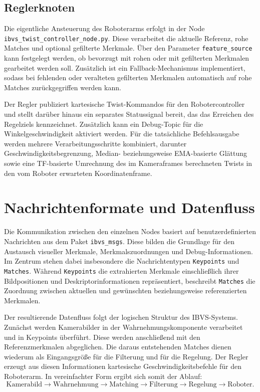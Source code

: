 \subsection{Reglerknoten}
\label{sec:implementierung_reglerknoten}

Die eigentliche Ansteuerung des Roboterarms erfolgt in der Node \texttt{ibvs\_twist\_controller\_node.py}. Diese verarbeitet die aktuelle Referenz, rohe Matches und optional gefilterte Merkmale. Über den Parameter \texttt{feature\_source} kann festgelegt werden, ob bevorzugt mit rohen oder mit gefilterten Merkmalen gearbeitet werden soll. Zusätzlich ist ein Fallback-Mechanismus implementiert, sodass bei fehlenden oder veralteten gefilterten Merkmalen automatisch auf rohe Matches zurückgegriffen werden kann. 

Der Regler publiziert kartesische Twist-Kommandos für den Robotercontroller und stellt darüber hinaus ein separates Statussignal bereit, das das Erreichen des Regelziels kennzeichnet. Zusätzlich kann ein Debug-Topic für die Winkelgeschwindigkeit aktiviert werden. Für die tatsächliche Befehlsausgabe werden mehrere Verarbeitungsschritte kombiniert, darunter Geschwindigkeitsbegrenzung, Median- beziehungsweise \ac{EMA}-basierte Glättung sowie eine \ac{TF}-basierte Umrechnung des im Kameraframes berechneten Twists in den vom Roboter erwarteten Koordinatenframe. 

\section{Nachrichtenformate und Datenfluss}
\label{sec:nachrichtenformate_datenfluss}

Die Kommunikation zwischen den einzelnen Nodes basiert auf benutzerdefinierten Nachrichten aus dem Paket \texttt{ibvs\_msgs}. Diese bilden die Grundlage für den Austausch visueller Merkmale, Merkmalszuordnungen und Debug-Informationen. Im Zentrum stehen dabei insbesondere die Nachrichtentypen \texttt{Keypoints} und \texttt{Matches}. Während \texttt{Keypoints} die extrahierten Merkmale einschließlich ihrer Bildpositionen und Deskriptorinformationen repräsentiert, beschreibt \texttt{Matches} die Zuordnung zwischen aktuellen und gewünschten beziehungsweise referenzierten Merkmalen.

Der resultierende Datenfluss folgt der logischen Struktur des \ac{IBVS}-Systems. Zunächst werden Kamerabilder in der Wahrnehmungskomponente verarbeitet und in Keypoints überführt. Diese werden anschließend mit den Referenzmerkmalen abgeglichen. Die daraus entstehenden Matches dienen wiederum als Eingangsgröße für die Filterung und für die Regelung. Der Regler erzeugt aus diesen Informationen kartesische Geschwindigkeitsbefehle für den Roboterarm. In vereinfachter Form ergibt sich somit der Ablauf:
\[
\text{Kamerabild} \rightarrow \text{Wahrnehmung} \rightarrow \text{Matching} \rightarrow \text{Filterung} \rightarrow \text{Regelung} \rightarrow \text{Roboter}.
\]


